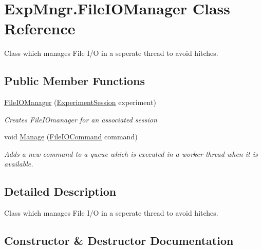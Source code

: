 \hypertarget{class_exp_mngr_1_1_file_i_o_manager}{}\section{Exp\+Mngr.\+File\+I\+O\+Manager Class Reference}
\label{class_exp_mngr_1_1_file_i_o_manager}


Class which manages File I/O in a seperate thread to avoid hitches.  


\subsection*{Public Member Functions}
\begin{DoxyCompactItemize}
\item 
\hyperlink{class_exp_mngr_1_1_file_i_o_manager_ae373e62bdd34774d59612e42c86a548a}{File\+I\+O\+Manager} (\hyperlink{class_exp_mngr_1_1_experiment_session}{Experiment\+Session} experiment)
\begin{DoxyCompactList}\small\item\em Creates File\+I\+Omanager for an associated session \end{DoxyCompactList}\item 
void \hyperlink{class_exp_mngr_1_1_file_i_o_manager_ad5fd364f256d4a9660cc544760371c6a}{Manage} (\hyperlink{class_exp_mngr_1_1_file_i_o_command}{File\+I\+O\+Command} command)
\begin{DoxyCompactList}\small\item\em Adds a new command to a queue which is executed in a worker thread when it is available. \end{DoxyCompactList}\end{DoxyCompactItemize}


\subsection{Detailed Description}
Class which manages File I/O in a seperate thread to avoid hitches. 



\subsection{Constructor \& Destructor Documentation}
\mbox{\label{class_exp_mngr_1_1_file_i_o_manager_ae373e62bdd34774d59612e42c86a548a}} 
